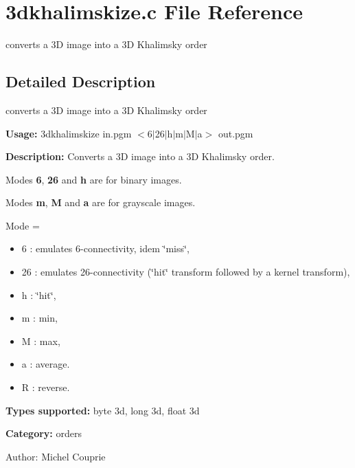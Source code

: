 \section{3dkhalimskize.c File Reference}
\label{3dkhalimskize_8c}
converts a 3D image into a 3D Khalimsky order 



\subsection{Detailed Description}
converts a 3D image into a 3D Khalimsky order 

{\bf Usage:} 3dkhalimskize in.pgm $<$6$|$26$|$h$|$m$|$M$|$a$>$ out.pgm

{\bf Description:} Converts a 3D image into a 3D Khalimsky order.

Modes {\bf 6}, {\bf 26} and {\bf h} are for binary images.

Modes {\bf m}, {\bf M} and {\bf a} are for grayscale images.

Mode = \begin{itemize}
\item 6 : emulates 6-connectivity, idem \char`\"{}miss\char`\"{}, \item 26 : emulates 26-connectivity (\char`\"{}hit\char`\"{} transform followed by a kernel transform), \item h : \char`\"{}hit\char`\"{}, \item m : min, \item M : max, \item a : average. \item R : reverse.\end{itemize}
{\bf Types supported:} byte 3d, long 3d, float 3d

{\bf Category:} orders

\begin{Desc}
\item[Author:]Michel Couprie \end{Desc}
